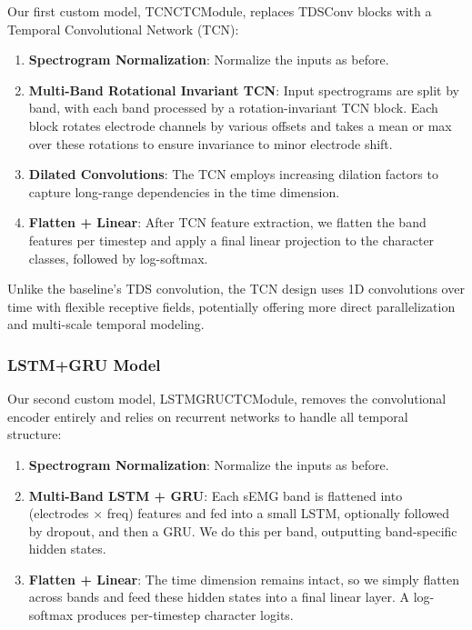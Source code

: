 Our first custom model, TCNCTCModule, replaces TDSConv blocks with a Temporal Convolutional Network (TCN):

\begin{enumerate}
    \item\textbf{Spectrogram Normalization}: Normalize the inputs as before.

    \item\textbf{Multi-Band Rotational Invariant TCN}: Input spectrograms are split by band, with each band processed by a rotation-invariant TCN block. Each block rotates electrode channels by various offsets and takes a mean or max over these rotations to ensure invariance to minor electrode shift.

    \item\textbf{Dilated Convolutions}: The TCN employs increasing dilation factors to capture long-range dependencies in the time dimension.
    
    \item\textbf{Flatten + Linear}: After TCN feature extraction, we flatten the band features per timestep and apply a final linear projection to the character classes, followed by log-softmax.
\end{enumerate}

Unlike the baseline’s TDS convolution, the TCN design uses 1D convolutions over time with flexible receptive fields, potentially offering more direct parallelization and multi-scale temporal modeling.

\subsubsection{LSTM+GRU Model}

Our second custom model, LSTMGRUCTCModule, removes the convolutional encoder entirely and relies on recurrent networks to handle all temporal structure:
\begin{enumerate}
    \item\textbf{Spectrogram Normalization}: Normalize the inputs as before.

    \item \textbf{Multi-Band LSTM + GRU}: Each sEMG band is flattened into (electrodes × freq) features and fed into a small LSTM, optionally followed by dropout, and then a GRU. We do this per band, outputting band-specific hidden states.

    \item \textbf{Flatten + Linear}: The time dimension remains intact, so we simply flatten across bands and feed these hidden states into a final linear layer. A log-softmax produces per-timestep character logits.
\end{enumerate}

